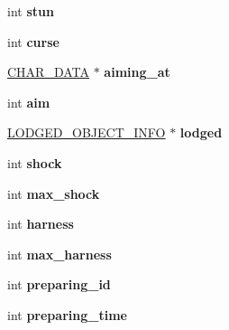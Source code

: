 \begin{DoxyCompactItemize}
\item 
\hypertarget{structchar__data_a342f1272b59311c96d7008f45888713e}{int {\bfseries stun}}\label{structchar__data_a342f1272b59311c96d7008f45888713e}

\item 
\hypertarget{structchar__data_acda20f5812b2e734dee99a68f8fc7af2}{int {\bfseries curse}}\label{structchar__data_acda20f5812b2e734dee99a68f8fc7af2}

\item 
\hypertarget{structchar__data_a341c2eb7bc677eec613148ef7cb636d5}{\hyperlink{structchar__data}{C\-H\-A\-R\-\_\-\-D\-A\-T\-A} $\ast$ {\bfseries aiming\-\_\-at}}\label{structchar__data_a341c2eb7bc677eec613148ef7cb636d5}

\item 
\hypertarget{structchar__data_abd65775c62e3fde71c70527bce24b1b5}{int {\bfseries aim}}\label{structchar__data_abd65775c62e3fde71c70527bce24b1b5}

\item 
\hypertarget{structchar__data_ae58dd2f4f4945c5d1461ef240376aef9}{\hyperlink{structlodged__object__info}{L\-O\-D\-G\-E\-D\-\_\-\-O\-B\-J\-E\-C\-T\-\_\-\-I\-N\-F\-O} $\ast$ {\bfseries lodged}}\label{structchar__data_ae58dd2f4f4945c5d1461ef240376aef9}

\item 
\hypertarget{structchar__data_a3c720bdd1b4a14ab8eed1d46509b9c61}{int {\bfseries shock}}\label{structchar__data_a3c720bdd1b4a14ab8eed1d46509b9c61}

\item 
\hypertarget{structchar__data_a6f740d85354d55a58dd75c02bad9ad41}{int {\bfseries max\-\_\-shock}}\label{structchar__data_a6f740d85354d55a58dd75c02bad9ad41}

\item 
\hypertarget{structchar__data_a7be47f9e35fc6f438dd0544082675b8b}{int {\bfseries harness}}\label{structchar__data_a7be47f9e35fc6f438dd0544082675b8b}

\item 
\hypertarget{structchar__data_a6abd5274e9c47b28568270d8fffa2542}{int {\bfseries max\-\_\-harness}}\label{structchar__data_a6abd5274e9c47b28568270d8fffa2542}

\item 
\hypertarget{structchar__data_aa4e19f32ec4058bbcf5ed409ca0ddae7}{int {\bfseries preparing\-\_\-id}}\label{structchar__data_aa4e19f32ec4058bbcf5ed409ca0ddae7}

\item 
\hypertarget{structchar__data_a51ab2615e2a97987ecae3f4d64efd044}{int {\bfseries preparing\-\_\-time}}\label{structchar__data_a51ab2615e2a97987ecae3f4d64efd044}


\end{DoxyCompactItemize}
